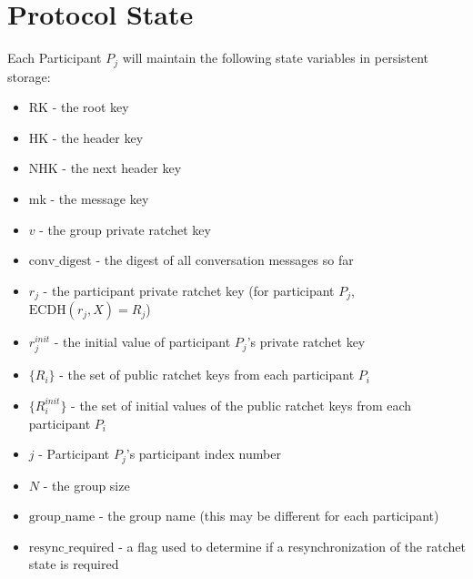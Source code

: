 \documentclass[%
preprint,
amsmath,amssymb,
aps,
prb,
floatfix,
]{revtex4-1}
\begin{document}
\section{\label{sec:protocolstate}Protocol State}
Each Participant $P_j$ will maintain the following state variables in persistent
storage:
\begin{itemize}
\item RK - the root key
\item HK - the header key
\item NHK - the next header key
\item mk - the message key
\item $v$ - the group private ratchet key
\item $\mathrm{conv\_digest}$ - the digest of all conversation messages so far
\item $r_j$ - the participant private ratchet key (for participant $P_j$,
$\mathrm{ECDH}(r_j, X) = R_j$)
\item $r_j^{init}$ - the initial value of participant $P_j$'s private ratchet
key
\item $\{R_i\}$ - the set of public ratchet keys from each participant $P_i$
\item $\{R_i^{init}\}$ - the set of initial values of the public ratchet keys from
each participant $P_i$
\item $j$ - Participant $P_j$'s participant index number
\item $N$ - the group size
\item $\mathrm{group\_name}$ - the group name (this may be different for each participant)
\item $\mathrm{resync\_required}$ - a flag used to determine if a resynchronization of the
ratchet state is required
\end{itemize}
\end{document}
